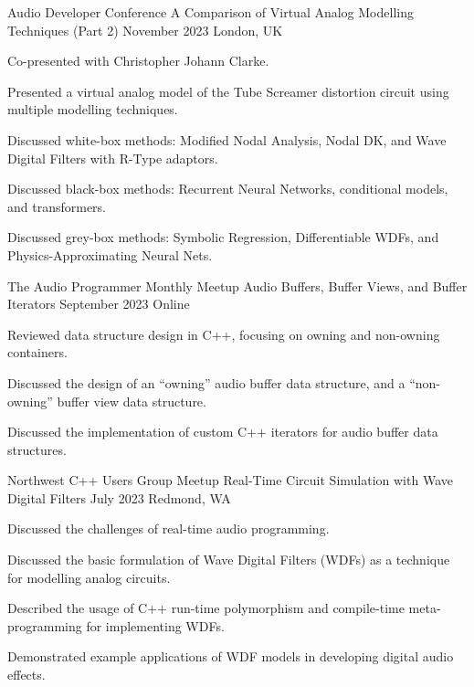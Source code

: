 \begin{cventries}
  \cventry
    {Audio Developer Conference} %
    {A Comparison of Virtual Analog Modelling Techniques (Part 2)} %
    {November 2023} %
    {London, UK} %
    {
      \begin{cvitems} %
        \item {Co-presented with Christopher Johann Clarke.}
        \item {Presented a virtual analog model of the Tube Screamer distortion circuit using multiple modelling techniques.}
        \item {Discussed white-box methods: Modified Nodal Analysis, Nodal DK, and Wave Digital Filters with R-Type adaptors.}
        \item {Discussed black-box methods: Recurrent Neural Networks, conditional models, and transformers.}
        \item {Discussed grey-box methods: Symbolic Regression, Differentiable WDFs, and Physics-Approximating Neural Nets.}
      \end{cvitems}
    }

\cventry
{The Audio Programmer Monthly Meetup} %
{Audio Buffers, Buffer Views, and Buffer Iterators} %
{September 2023} %
{Online} %
{
  \begin{cvitems} %
    \item {Reviewed data structure design in C++, focusing on owning and non-owning containers.}
    \item {Discussed the design of an ``owning'' audio buffer data structure, and a ``non-owning'' buffer view data structure.}
    \item {Discussed the implementation of custom C++ iterators for audio buffer data structures.}
  \end{cvitems}
}

  \cventry
    {Northwest C++ Users Group Meetup} %
    {Real-Time Circuit Simulation with Wave Digital Filters} %
    {July 2023} %
    {Redmond, WA} %
    {
      \begin{cvitems} %
        \item {Discussed the challenges of real-time audio programming.}
        \item {Discussed the basic formulation of Wave Digital Filters (WDFs) as a technique for modelling analog circuits.}
        \item {Described the usage of C++ run-time polymorphism and compile-time meta-programming for implementing WDFs.}
        \item {Demonstrated example applications of WDF models in developing digital audio effects.}
      \end{cvitems}
    }


\end{cventries}

